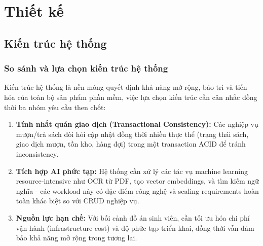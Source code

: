 \section{Thiết kế}
\subsection{Kiến trúc hệ thống}
\label{subsec:system-architecture}
\subsubsection{So sánh và lựa chọn kiến trúc hệ thống}
Kiến trúc hệ thống là nền móng quyết định khả năng mở rộng, bảo trì và tiến hóa của toàn bộ sản phẩm phần mềm, việc lựa chọn kiến trúc cần cân nhắc đồng thời ba nhóm yêu cầu then chốt:
\begin{enumerate}
    \item \textbf{Tính nhất quán giao dịch (Transactional Consistency):} Các nghiệp vụ mượn/trả sách đòi hỏi cập nhật đồng thời nhiều thực thể (trạng thái sách, giao dịch mượn, tồn kho, hàng đợi) trong một transaction ACID để tránh inconsistency.
    
    \item \textbf{Tích hợp AI phức tạp:} Hệ thống cần xử lý các tác vụ machine learning resource-intensive như OCR từ PDF, tạo vector embeddings, và tìm kiếm ngữ nghĩa - các workload này có đặc điểm công nghệ và scaling requirements hoàn toàn khác biệt so với CRUD nghiệp vụ.
    
    \item \textbf{Nguồn lực hạn chế:} Với bối cảnh đồ án sinh viên, cần tối ưu hóa chi phí vận hành (infrastructure cost) và độ phức tạp triển khai, đồng thời vẫn đảm bảo khả năng mở rộng trong tương lai.
\end{enumerate}


